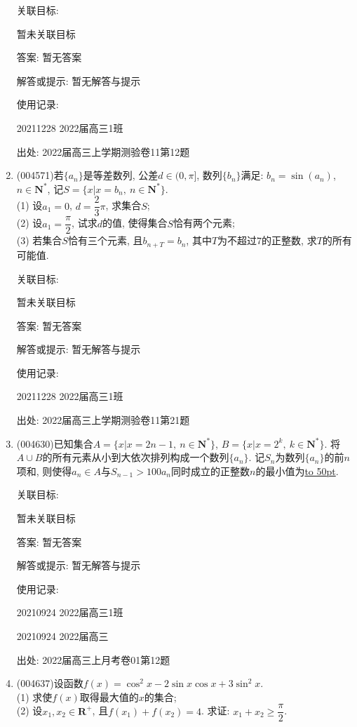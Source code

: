 \documentclass[10pt,a4paper]{article}
\newcommand{\blank}[1]{\underline{\hbox to #1pt{}}}
\begin{document}
\begin{enumerate}[1.]
关联目标:

暂未关联目标

答案: 暂无答案

解答或提示: 暂无解答与提示

使用记录:

20211228	2022届高三1班	


出处: 2022届高三上学期测验卷11第12题
\item { (004571)}若$\{a_n\}$是等差数列, 公差$d\in (0,\pi]$, 数列$\{b_n\}$满足: $b_n=\sin (a_n)$, $n \in \mathbf{N}^*$, 记$S=\{x|x=b_n, \ n\in \mathbf{N}^*\}$.\\
(1) 设$a_1=0$, $d=\dfrac 23 \pi$, 求集合$S$;\\
(2) 设$a_1=\dfrac\pi 2$, 试求$d$的值, 使得集合$S$恰有两个元素;\\
(3) 若集合$S$恰有三个元素, 且$b_{n+T}=b_n$, 其中$T$为不超过$7$的正整数, 求$T$的所有可能值.


关联目标:

暂未关联目标

答案: 暂无答案

解答或提示: 暂无解答与提示

使用记录:

20211228	2022届高三1班			


出处: 2022届高三上学期测验卷11第21题
\item { (004630)}已知集合$A=\{x|x=2n-1, \ n\in \mathbf{N}^*\}$, $B=\{x|x=2^k, \ k\in \mathbf{N}^*\}$. 将$A\cup B$的所有元素从小到大依次排列构成一个数列$\{a_n\}$. 记$S_n$为数列$\{a_n\}$的前$n$项和, 则使得$a_n\in A$与${S_{n-1}}>100{a_n}$同时成立的正整数$n$的最小值为\blank{50}.


关联目标:

暂未关联目标

答案: 暂无答案

解答或提示: 暂无解答与提示

使用记录:

20210924	2022届高三1班	

20210924	2022届高三	


出处: 2022届高三上月考卷01第12题
\item { (004637)}设函数$f(x)=\cos^2x-2\sin x\cos x+3\sin^2x$.\\
(1) 求使$f(x)$取得最大值的$x$的集合;\\
(2) 设$x_1,x_2\in \mathbf{R}^+$, 且$f(x_1)+f(x_2)=4$. 求证: $x_1+x_2\ge \dfrac{\pi}2$.



\end{enumerate}
\end{document}
